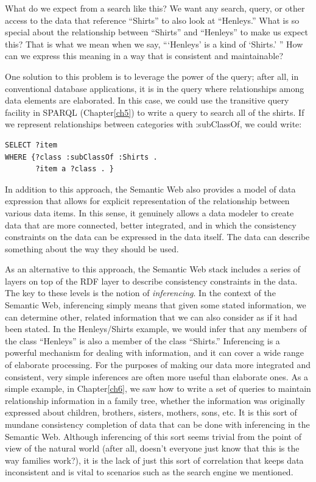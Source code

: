 What do we expect from a search like this? We want any search, query, or
other access to the data that reference ``Shirts'' to also look at
``Henleys.'' What is so special about the relationship between
``Shirts'' and ``Henleys'' to make us expect this? That is what we mean
when we say, ```Henleys' is a kind of `Shirts.' '' How can we express
this meaning in a way that is consistent and maintainable?

One solution to this problem is to leverage the power of the query;
after all, in conventional database applications, it is in the query
where relationships among data elements are elaborated. In this case, we
could use the transitive query facility in SPARQL (Chapter\ref{ch5}) to write a
query to search all of the shirts. If we represent relationships between
categories with :subClassOf, we could write:

\begin{lstlisting}
SELECT ?item
WHERE {?class :subClassOf :Shirts .
       ?item a ?class . }
\end{lstlisting}


In addition to this approach, the Semantic Web also provides a model of
data expression that allows for explicit representation of the
relationship between various data items. In this sense, it genuinely
allows a data modeler to create data that are more connected, better
integrated, and in which the consistency constraints on the data can be
expressed in the data itself. The data can describe something about the
way they should be used.

As an alternative to this approach, the Semantic Web stack includes a
series of layers on top of the RDF layer to describe consistency
constraints in the data. The key to these levels is the notion of
\emph{inferencing}. In the context of the Semantic Web, inferencing
simply means that given some stated information, we can determine other,
related information that we can also consider as if it had been stated.
In the Henleys/Shirts example, we would infer that any members of the
class ``Henleys'' is also a member of the class ``Shirts.'' Inferencing
is a powerful mechanism for dealing with information, and it can cover a
wide range of elaborate processing. For the purposes of making our data
more integrated and consistent, very simple inferences are often more
useful than elaborate ones. As a simple example, in Chapter\ref{ch6}, we saw
how to write a set of queries to maintain relationship information in a
family tree, whether the information was originally expressed about
children, brothers, sisters, mothers, sons, etc. It is this sort of
mundane consistency completion of data that can be done with inferencing
in the Semantic Web. Although inferencing of this sort seems trivial
from the point of view of the natural world (after all, doesn't everyone
just know that this is the way families work?), it is the lack of just
this sort of correlation that keeps data inconsistent and is vital to
scenarios such as the search engine we mentioned.

